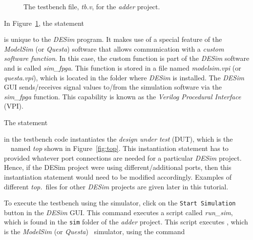 {\begin{figure}[H]
\begin{center}
\begin{minipage}[t]{18 cm}
	
\end{minipage}
	\caption{The testbench file, {\it tb.v}, for the {\it adder} project.}
	\label{fig:tb}
\end{center}
\end{figure}

In Figure~\ref{fig:tb}, the statement



is unique to the {\it DESim} program. It makes use of a special feature of the
{\it ModelSim} (or {\it Questa}) software that allows communication with a 
{\it custom software function}. In this case, the custom function is part of the {\it DESim} 
software and is called {\it sim\_fpga}. This function is stored in a file named 
{\it modelsim.vpi} (or {\it questa.vpi}), which is located in the folder where {\it DESim} is
installed. The {\it DESim} GUI sends/receives signal values to/from the simulation software 
via the {\it sim\_fpga} function. 
This capability is known as the {\it Verilog Procedural Interface} (VPI). 

The statement



in the testbench code instantiates the {\it design under test} (DUT), which is the 
\hdlName~\hdlModuleName~named {\it top} shown in Figure~\ref{fig:top}. This instantiation
statement has to provided whatever port connections are needed for a particular {\it DESim}
project. Hence, if the DESim project were using different/additional ports, then this
instantiation statement would need to be modified accordingly. Examples of different 
{\it top.\hdlFileExt}~files for other {\it DESim} projects are given later in this tutorial.

To execute the testbench using the simulator, click on the \texttt{Start Simulation} button 
in the {\it DESim} GUI. This command executes a script called {\it run\_sim}, which is found 
in the \texttt{sim} folder of the {\it adder} project. This script executes 
\fi, which is the {\it ModelSim} (or {\it Questa}) 
\hdlName~simulator, using the command

}
